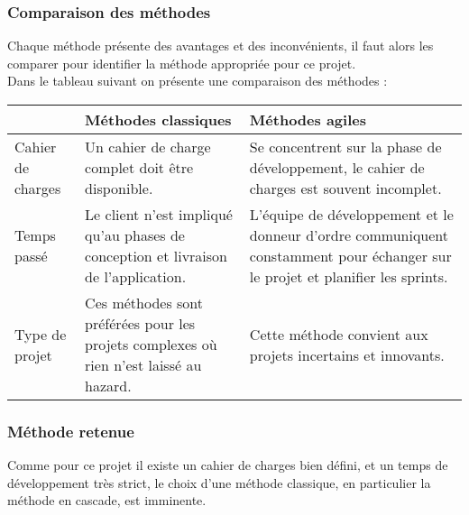 \subsubsection{Comparaison des méthodes}
Chaque méthode présente des avantages et des inconvénients, il faut alors les comparer pour identifier la méthode appropriée pour ce projet.\\
\noindent Dans le tableau suivant on présente une comparaison des méthodes :\\
\begin{center}
    \begin{tabularx}{0.8\textwidth} {
            | >{\centering\arraybackslash}X
            | >{\centering\arraybackslash}X
            | >{\centering\arraybackslash}X |}
        \hline
                          & Méthodes classiques                                                                    & Méthodes agiles                                                                                                                \\
        \hline
        Cahier de charges & Un cahier de charge complet doit être disponible.                                      & Se concentrent sur la phase de développement, le cahier de charges est souvent incomplet.                                      \\
        \hline
        Temps passé       & Le client n'est impliqué qu'au phases de conception et livraison de l'application.     & L'équipe de développement et le donneur d'ordre communiquent constamment pour échanger sur le projet et planifier les sprints. \\
        \hline
        Type de projet    & Ces méthodes sont préférées pour les projets complexes où rien n'est laissé au hazard. & Cette méthode convient aux projets incertains et innovants.                                                                    \\
        \hline
    \end{tabularx}
\end{center}
\subsubsection{Méthode retenue}
Comme pour ce projet il existe un cahier de charges bien défini, et un temps de développement très strict, le choix d'une méthode classique, en particulier la méthode en cascade, est imminente.

